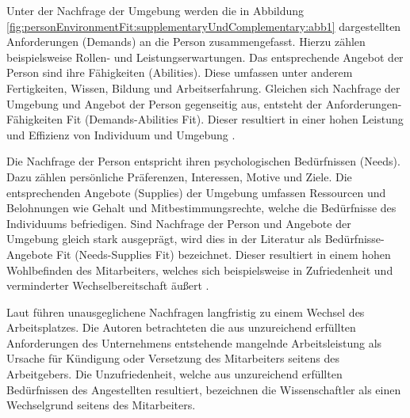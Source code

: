 Unter der Nachfrage der Umgebung werden die in Abbildung \ref{fig:personEnvironmentFit:supplementaryUndComplementary:abb1} dargestellten Anforderungen (Demands) an die Person zusammengefasst. Hierzu zählen beispielsweise Rollen- und Leistungserwartungen. Das entsprechende Angebot der Person sind ihre Fähigkeiten (Abilities). Diese umfassen unter anderem Fertigkeiten, Wissen, Bildung und Arbeitserfahrung. Gleichen sich Nachfrage der Umgebung und Angebot der Person gegenseitig aus, entsteht der Anforderungen-Fähigkeiten Fit (Demands-Abilities Fit). Dieser resultiert in einer hohen Leistung und Effizienz von Individuum und Umgebung \cite[S. 3f.]{edwards:1991}\cite[S. 5]{edwards:1996}\cite[S. 4f.]{edwards:2007}\cite[S. 6]{su:2015}.

Die Nachfrage der Person entspricht ihren psychologischen Bedürfnissen (Needs). Dazu zählen persönliche Präferenzen, Interessen, Motive und Ziele. Die entsprechenden Angebote (Supplies) der Umgebung umfassen Ressourcen und Belohnungen wie Gehalt und Mitbestimmungsrechte, welche die Bedürfnisse des Individuums befriedigen. Sind Nachfrage der Person und Angebote der Umgebung gleich stark ausgeprägt, wird dies in der Literatur als Bedürfnisse-Angebote Fit (Needs-Supplies Fit) bezeichnet. Dieser resultiert in einem hohen Wohlbefinden des Mitarbeiters, welches sich beispielsweise in Zufriedenheit und verminderter Wechselbereitschaft äußert \cite[S. 2]{edwards:2004}\cite[S. 2f.]{edwards:1996}\cite[S. 4]{edwards:2008}\cite[S. 4f.]{edwards:2007}\cite[S. 6]{su:2015}.

Laut \textcite[S. 9ff.]{workAdjustment:1964} führen unausgeglichene Nachfragen langfristig zu einem Wechsel des Arbeitsplatzes. Die Autoren betrachteten die aus unzureichend erfüllten Anforderungen des Unternehmens entstehende mangelnde Arbeitsleistung als Ursache für Kündigung oder Versetzung des Mitarbeiters seitens des Arbeitgebers. Die Unzufriedenheit, welche aus unzureichend erfüllten Bedürfnissen des Angestellten resultiert, bezeichnen die Wissenschaftler als einen Wechselgrund seitens des Mitarbeiters.

